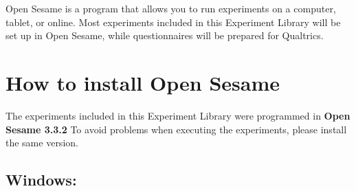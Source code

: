 \documentclass[
]{book}
\begin{document}
Open Sesame is a program that allows you to run experiments on a computer, tablet, or online. Most experiments included in this Experiment Library will be set up in Open Sesame, while questionnaires will be prepared for Qualtrics.

\hypertarget{how-to-install-open-sesame}{%
\section{How to install Open Sesame}\label{how-to-install-open-sesame}}

The experiments included in this Experiment Library were programmed in \textbf{Open Sesame 3.3.2} To avoid problems when executing the experiments, please install the same version.

\hypertarget{windows}{%
\subsection{Windows:}\label{windows}}
\end{document}
